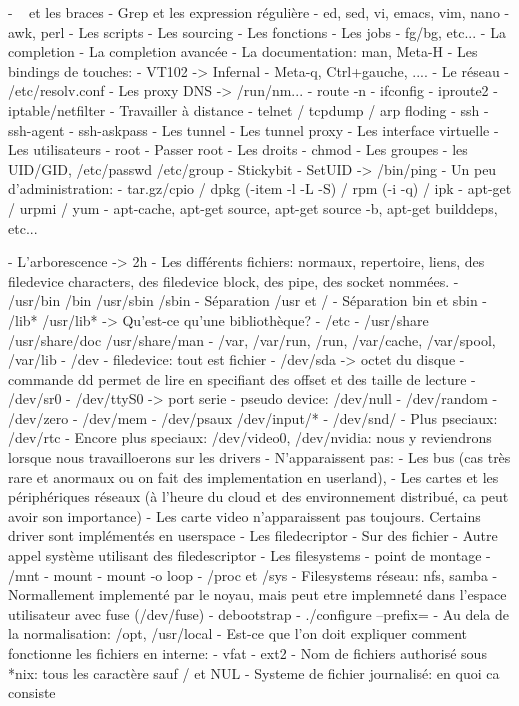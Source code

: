 \documentclass[10pt,ucs,usepdftitle=false]{beamer}
\begin{document}
    - ~ et les braces
    - Grep et les expression régulière
    - ed, sed, vi, emacs, vim, nano
    - awk, perl
    - Les scripts
      - Les sourcing
      - Les fonctions
    - Les jobs
      - fg/bg, etc...
    - La completion
      - La completion avancée
    - La documentation: man, Meta-H
    - Les bindings de touches:
       - VT102 -> Infernal
       - Meta-q, Ctrl+gauche, ....
    - Le réseau
      - /etc/resolv.conf
      - Les proxy DNS -> /run/nm...
      - route -n
      - ifconfig
      - iproute2
      - iptable/netfilter
    - Travailler à distance
      - telnet / tcpdump / arp floding
      - ssh
      - ssh-agent
      - ssh-askpass
      - Les tunnel
      - Les tunnel proxy
      - Les interface virtuelle
    - Les utilisateurs
       - root
       - Passer root
       - Les droits
       - chmod
       - Les groupes
       - les UID/GID, /etc/passwd /etc/group
       - Stickybit
       - SetUID -> /bin/ping
    - Un peu d'administration:
       - tar.gz/cpio / dpkg (-item -l -L -S) / rpm (-i -q) / ipk
       - apt-get / urpmi / yum
       - apt-cache, apt-get source, apt-get source -b, apt-get builddeps, etc...

  - L'arborescence -> 2h
    - Les différents fichiers: normaux, repertoire, liens, des filedevice characters, des filedevice block, des pipe, des socket nommées.
    - /usr/bin /bin /usr/sbin /sbin
      - Séparation /usr et /
      - Séparation bin et sbin
    - /lib* /usr/lib* -> Qu'est-ce qu'une bibliothèque?
    - /etc
    - /usr/share /usr/share/doc /usr/share/man
    - /var, /var/run, /run, /var/cache, /var/spool, /var/lib
    - /dev
      - filedevice: tout est fichier
      - /dev/sda -> octet du disque
        - commande dd permet de lire en specifiant des offset et des taille de lecture
      - /dev/sr0
      - /dev/ttyS0 -> port serie
      - pseudo device: /dev/null
      - /dev/random
      - /dev/zero
      - /dev/mem
      - /dev/psaux /dev/input/*
      - /dev/snd/
      - Plus pseciaux: /dev/rtc
      - Encore plus speciaux: /dev/video0, /dev/nvidia: nous y reviendrons lorsque nous travailloerons sur les drivers
      - N'apparaissent pas: 
        - Les bus (cas très rare et anormaux ou on fait des implementation en userland), 
        - Les cartes et les périphériques réseaux (à l'heure du cloud et des environnement distribué, ca peut avoir son importance)
      - Les carte video n'apparaissent pas toujours. Certains driver sont implémentés en userspace
      - Les filedecriptor
        - Sur des fichier
        - Autre appel système utilisant des filedescriptor
    - Les filesystems
      - point de montage
      - /mnt
      - mount
      - mount -o loop
      - /proc et /sys
      - Filesystems réseau: nfs, samba
      - Normallement implementé par le noyau, mais peut etre implemneté dans l'espace utilisateur avec fuse (/dev/fuse)
    - debootstrap
    - ./configure --prefix=
    - Au dela de la normalisation: /opt, /usr/local
    - Est-ce que l'on doit expliquer comment fonctionne les fichiers en interne:
       - vfat
       - ext2
    - Nom de fichiers authorisé sous *nix: tous les caractère sauf / et NUL
    - Systeme de fichier journalisé: en quoi ca consiste
\end{document}
